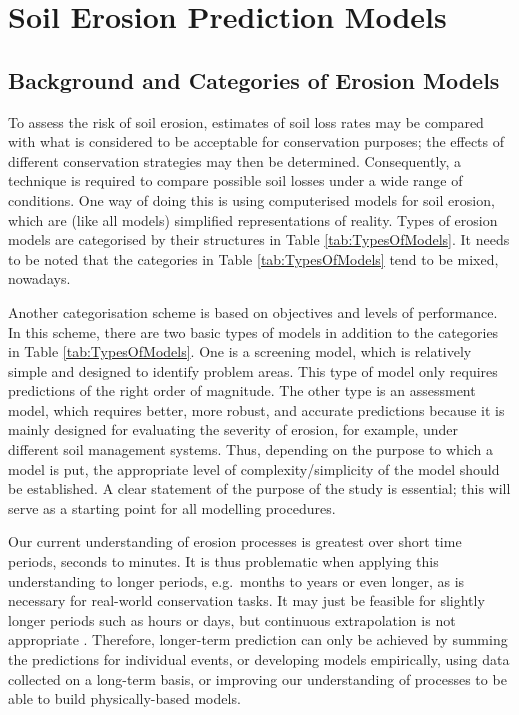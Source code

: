 \section{Soil Erosion Prediction Models}
\label{sec:SoilErosionPredictionModels}

\subsection{Background and Categories of Erosion Models}
\label{sec:Introductionerosionmodels}

To assess the risk of soil erosion, estimates of soil loss rates may be compared
with what is considered to be acceptable for conservation purposes; the effects
of different conservation strategies may then be determined. Consequently, a
technique is required to compare possible soil losses under a wide range of
conditions. One way of doing this is using computerised models for soil erosion,
which are (like all models) simplified representations of reality. Types of
erosion models are categorised by their structures in Table
\ref{tab:TypesOfModels}. It needs to be noted that the categories in Table
\ref{tab:TypesOfModels} tend to be mixed, nowadays.


Another categorisation scheme is based on objectives and levels of performance.
In this scheme, there are two basic types of models in addition to the
categories in Table \ref{tab:TypesOfModels}. One is a screening model, which is
relatively simple and designed to identify problem areas. This type of model
only requires predictions of the right order of magnitude. The other type is an
assessment model, which requires better, more robust, and accurate predictions
because it is mainly designed for evaluating the severity of erosion, for
example, under different soil management systems. Thus, depending on the purpose
to which a model is put, the appropriate level of complexity/simplicity of
the model should be established. A clear statement of the purpose of the study
is essential; this will serve as a starting point for all modelling procedures.

Our current understanding of erosion processes is greatest over short time
periods, seconds to minutes. It is thus problematic when applying this
understanding to longer periods, e.g.\ months to years or even longer, as is
necessary for real-world conservation tasks. It may just be feasible for
slightly longer periods such as hours or days, but continuous extrapolation is
not appropriate \citep{kirkby1992-180,morgan1995-soil}. Therefore, longer-term
prediction can only be achieved by summing the predictions for individual
events, or developing models empirically, using data collected on a long-term
basis, or improving our understanding of processes to be able to build
physically-based models.

